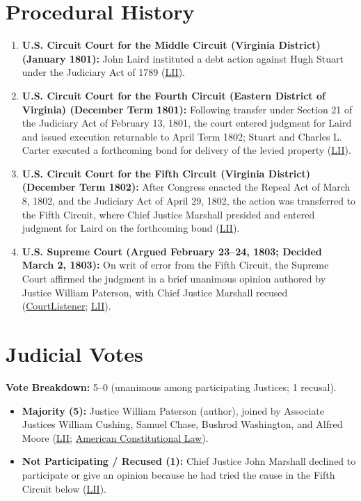 \documentclass[12pt]{article}
\begin{document}
\section{Procedural History}

\begin{enumerate}
\item \textbf{U.S. Circuit Court for the Middle Circuit (Virginia District) (January 1801):} John Laird instituted a debt action against Hugh Stuart under the Judiciary Act of 1789 (\href{https://www.law.cornell.edu/supremecourt/text/5/299}{LII}).
\item \textbf{U.S. Circuit Court for the Fourth Circuit (Eastern District of Virginia) (December Term 1801):} Following transfer under Section 21 of the Judiciary Act of February 13, 1801, the court entered judgment for Laird and issued execution returnable to April Term 1802; Stuart and Charles L. Carter executed a forthcoming bond for delivery of the levied property (\href{https://www.law.cornell.edu/supremecourt/text/5/299}{LII}).
\item \textbf{U.S. Circuit Court for the Fifth Circuit (Virginia District) (December Term 1802):} After Congress enacted the Repeal Act of March 8, 1802, and the Judiciary Act of April 29, 1802, the action was transferred to the Fifth Circuit, where Chief Justice Marshall presided and entered judgment for Laird on the forthcoming bond (\href{https://www.law.cornell.edu/supremecourt/text/5/299}{LII}).
\item \textbf{U.S. Supreme Court (Argued February 23--24, 1803; Decided March 2, 1803):} On writ of error from the Fifth Circuit, the Supreme Court affirmed the judgment in a brief unanimous opinion authored by Justice William Paterson, with Chief Justice Marshall recused (\href{https://www.courtlistener.com/opinion/84769/stuart-v-laird/}{CourtListener}; \href{https://www.law.cornell.edu/supremecourt/text/5/299}{LII}).
\end{enumerate}

\section{Judicial Votes}

\textbf{Vote Breakdown:} 5--0 (unanimous among participating Justices; 1 recusal).
\begin{itemize}
\item \textbf{Majority (5):} Justice William Paterson (author), joined by Associate Justices William Cushing, Samuel Chase, Bushrod Washington, and Alfred Moore (\href{https://www.law.cornell.edu/supremecourt/text/5/299}{LII}; \href{https://americanconlaw.com/volume-i/volume-i-3-3/the-power-of-judicial-review/stuart-v-laird-1803/}{American Constitutional Law}).
\item \textbf{Not Participating / Recused (1):} Chief Justice John Marshall declined to participate or give an opinion because he had tried the cause in the Fifth Circuit below (\href{https://www.law.cornell.edu/supremecourt/text/5/299}{LII}).
\end{itemize}
\end{document}
